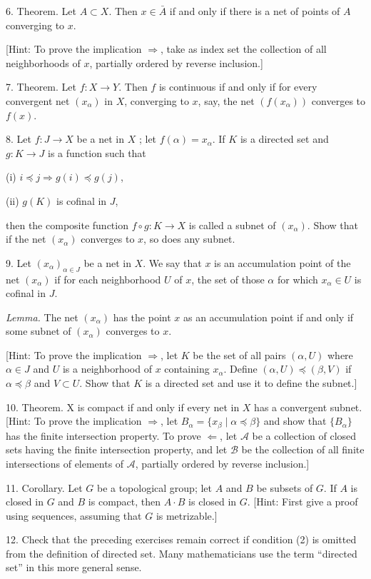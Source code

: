 6. Theorem. Let \(A \subset X\). Then \(x \in \bar{A}\) if and only if there is a net of points of \(A\) converging to \(x\).

[Hint: To prove the implication \(\Rightarrow\), take as index set the collection of all neighborhoods of \(x\), partially ordered by reverse inclusion.]

7. Theorem. Let \(f : X \rightarrow Y\). Then \(f\) is continuous if and only if for every convergent net \(( x_{\alpha })\) in \(X\), converging to \(x\), say, the net \(( {f( x_{\alpha }) })\) converges to \(f(x)\).

8. Let \(f : J \rightarrow X\) be a net in \(X\) ; let \(f( \alpha ) = x_{\alpha }\). If \(K\) is a directed set and \(g : K \rightarrow J\) is a function such that

(i) \(i \preccurlyeq j \Rightarrow g( i) \preccurlyeq g( j)\),

(ii) \(g( K)\) is cofinal in \(J\),

then the composite function \(f \circ g : K \rightarrow X\) is called a subnet of \(( x_{\alpha })\). Show that if the net \(( x_{\alpha })\) converges to \(x\), so does any subnet.

9. Let \({( x_{\alpha }) }_{\alpha \in J}\) be a net in \(X\). We say that \(x\) is an accumulation point of the net \(( x_{\alpha })\) if for each neighborhood \(U\) of \(x\), the set of those \(\alpha\) for which \(x_{\alpha } \in U\) is cofinal in \(J\).

\textsl{Lemma.}
 The net \(( x_{\alpha })\) has the point \(x\) as an accumulation point if and only if some subnet of \(( x_{\alpha })\) converges to \(x\).

[Hint: To prove the implication \(\Rightarrow\), let \(K\) be the set of all pairs \(( {\alpha, U})\) where \(\alpha \in J\) and \(U\) is a neighborhood of \(x\) containing \(x_{\alpha }\). Define \(( {\alpha, U}) \preccurlyeq ( {\beta, V})\) if \(\alpha \preccurlyeq \beta\) and \(V \subset U\). Show that \(K\) is a directed set and use it to define the subnet.]

10. Theorem. X is compact if and only if every net in \(X\) has a convergent subnet. [Hint: To prove the implication \(\Rightarrow\), let \(B_{\alpha } = \{ {x_{\beta } \mid \alpha \preccurlyeq \beta }\}\) and show that \(\{ B_{\alpha }\}\) has the finite intersection property. To prove \(\Leftarrow\), let \(\mathcal{A}\) be a collection of closed sets having the finite intersection property, and let \(\mathcal{B}\) be the collection of all finite intersections of elements of \(\mathcal{A}\), partially ordered by reverse inclusion.]

11. Corollary. Let \(G\) be a topological group; let \(A\) and \(B\) be subsets of \(G\). If \(A\) is closed in \(G\) and \(B\) is compact, then \(A \cdot B\) is closed in \(G\). [Hint: First give a proof using sequences, assuming that \(G\) is metrizable.]

12. Check that the preceding exercises remain correct if condition (2) is omitted from the definition of directed set. Many mathematicians use the term ``directed set'' in this more general sense.